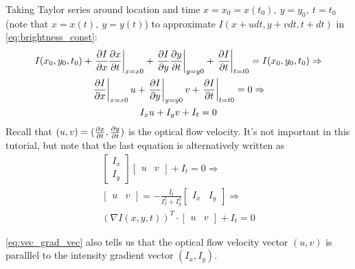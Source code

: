 \documentclass[a4paper]{article}
\begin{document}
Taking Taylor series around location and time $x=x_0=x(t_0),\: y=y_0, \: t=t_0$ (note that $x=x(t), \ y=y(t)$) to approximate $I(x+udt, y+vdt,t+dt )$ in \eqref{eq:brightness_const}:
\begin{gather}
I(x_0,y_0,t_0) + \left.\frac{\partial I}{\partial x}\frac{\partial x}{\partial t}\right|_{x=x0} + \left.\frac{\partial I}{\partial y}\frac{\partial y}{\partial t}\right|_{y=y0} + \left.\frac{\partial I}{\partial t}\right|_{t=t0} = I(x_0,y_0,t_0) \Rightarrow \nonumber \\
\left.\frac{\partial I}{\partial x}\right|_{x=x0}u + \left.\frac{\partial I}{\partial y}\right|_{y=y0}v + \left.\frac{\partial I}{\partial t}\right|_{t=t0} =0 \Rightarrow \\
I_xu + I_yv + I_t = 0 \label{eq:opt_flow_unknowns}
\end{gather}
Recall that $(u,v) =( \frac{\partial x}{\partial t},\frac{\partial y}{\partial t})$ is the optical flow velocity. It's not important in this tutorial, but note that the last equation is alternatively written as
\begin{gather}
    \begin{bmatrix}I_x \\ I_y \end{bmatrix}\begin{bmatrix}u & v \end{bmatrix} + I_t = 0 \Rightarrow \\
    \begin{bmatrix}u & v \end{bmatrix} = -\frac{I_t}{I_x^2 + I_y^2}\begin{bmatrix}I_x & I_y \end{bmatrix} \Rightarrow \label{eq:vec_grad_vec} \\
    \left(\nabla \textit{I}(x,y,t)\right)^T\cdot \begin{bmatrix}u & v \end{bmatrix} + I_t= 0
\end{gather}
\begin{corollary}
\eqref{eq:vec_grad_vec} also tells us that the optical flow velocity vector $(u,v)$ is paralllel to the intensity gradient vector $(I_x,I_y)$.
\end{corollary}
\end{document}

